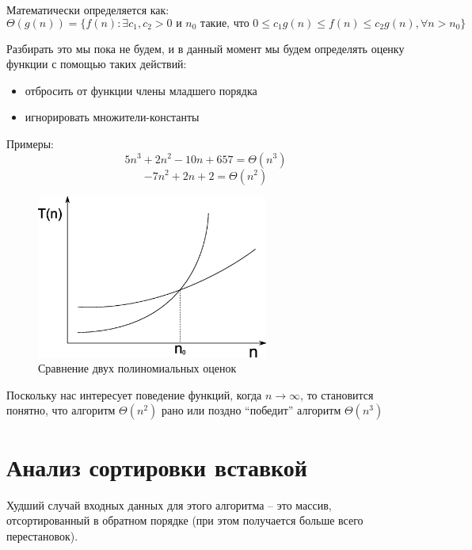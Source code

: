 \documentclass[a4paper,11pt]{article}
\begin{document}
Математически определяется как:
\begin{equation*}
  \Theta(g(n)) = \{ f(n): \exists c_1, c_2 > 0 \text{ и } n_0
  \text{ такие, что }
  0 \leqslant c_1 g(n) \leqslant f(n) \leqslant c_2 g(n), \forall n > n_0
  \}
\end{equation*}

Разбирать это мы пока не будем, и в данный момент мы будем определять оценку
функции с помощью таких действий:
\begin{itemize}
\item отбросить от функции члены младшего порядка
\item игнорировать множители-константы
\end{itemize}

Примеры:
\begin{equation*}
5n^3 + 2n^2 - 10n + 657 = \Theta(n^3)
\end{equation*}
\begin{equation*}
-7n^2 + 2n + 2 = \Theta(n^2)
\end{equation*}

\begin{figure}[ht]
  \centering
  \includegraphics[width=3in]{lecture1/theta-beats.eps}
  \caption{Сравнение двух полиномиальных оценок}
  \label{fig:thetas-comparison}
\end{figure}

Поскольку нас интересует поведение функций, когда $n \rightarrow \infty$, то
становится понятно, что алгоритм $\Theta(n^2)$ рано или поздно ``победит'' алгоритм
$\Theta(n^3)$

\section{Анализ сортировки вставкой}

Худший случай входных данных для этого алгоритма -- это массив, отсортированный в
обратном порядке (при этом получается больше всего перестановок).
\end{document}
